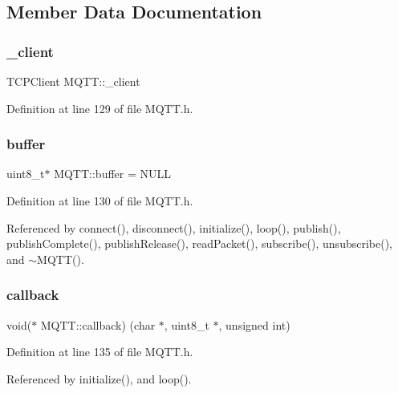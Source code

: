 \subsection{Member Data Documentation}
\mbox{\label{class_m_q_t_t_a0180f906b9bbff0f2845900df0e5475d}} 
\subsubsection{\+\_\+client}
{\footnotesize\ttfamily T\+C\+P\+Client M\+Q\+T\+T\+::\+\_\+client\hspace{0.3cm}{\ttfamily [private]}}



Definition at line 129 of file M\+Q\+T\+T.\+h.

\mbox{\label{class_m_q_t_t_a1d884782e6eec91dabe49b0bb4360a39}} 
\subsubsection{buffer}
{\footnotesize\ttfamily uint8\+\_\+t$\ast$ M\+Q\+T\+T\+::buffer = N\+U\+LL\hspace{0.3cm}{\ttfamily [private]}}



Definition at line 130 of file M\+Q\+T\+T.\+h.



Referenced by connect(), disconnect(), initialize(), loop(), publish(), publish\+Complete(), publish\+Release(), read\+Packet(), subscribe(), unsubscribe(), and $\sim$\+M\+Q\+T\+T().

\mbox{\label{class_m_q_t_t_ad40d1645b7ec6c7b969883825f0c0469}} 
\subsubsection{callback}
{\footnotesize\ttfamily void($\ast$ M\+Q\+T\+T\+::callback) (char $\ast$, uint8\+\_\+t $\ast$, unsigned int)\hspace{0.3cm}{\ttfamily [private]}}



Definition at line 135 of file M\+Q\+T\+T.\+h.



Referenced by initialize(), and loop().

